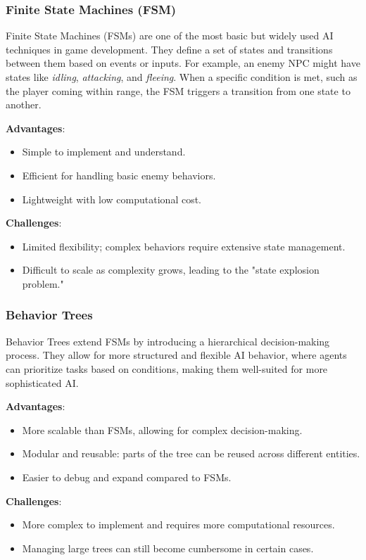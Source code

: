 \documentclass{article} %
\begin{document}
\subsubsection{Finite State Machines (FSM)}

Finite State Machines (FSMs) are one of the most basic but widely used AI techniques in game development. They define a set of states and transitions between them based on events or inputs. For example, an enemy NPC might have states like \textit{idling}, \textit{attacking}, and \textit{fleeing}. When a specific condition is met, such as the player coming within range, the FSM triggers a transition from one state to another.

\textbf{Advantages}:
\begin{itemize}
	\item Simple to implement and understand.
	\item Efficient for handling basic enemy behaviors.
	\item Lightweight with low computational cost.
\end{itemize}

\textbf{Challenges}:
\begin{itemize}
	\item Limited flexibility; complex behaviors require extensive state management.
	\item Difficult to scale as complexity grows, leading to the "state explosion problem." \end{itemize}

\subsubsection{Behavior Trees}

Behavior Trees extend FSMs by introducing a hierarchical decision-making process. They allow for more structured and flexible AI behavior, where agents can prioritize tasks based on conditions, making them well-suited for more sophisticated AI.

\textbf{Advantages}:
\begin{itemize}
	\item More scalable than FSMs, allowing for complex decision-making.
	\item Modular and reusable: parts of the tree can be reused across different entities.
	\item Easier to debug and expand compared to FSMs.
\end{itemize}

\textbf{Challenges}:
\begin{itemize}
	\item More complex to implement and requires more computational resources.
	\item Managing large trees can still become cumbersome in certain cases.
\end{itemize}
\end{document}
